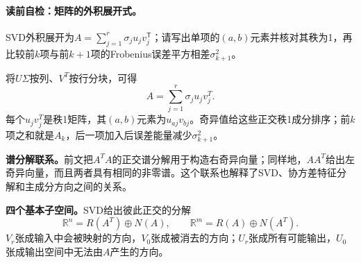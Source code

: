 \paragraph{读前自检：矩阵的外积展开式。}SVD外积展开为$A=\sum_{j=1}^r\sigma_ju_jv_j^{\mathsf T}$；请写出单项的$(a,b)$元素并核对其秩为1，再比较前$k$项与前$k+1$项的Frobenius误差平方相差$\sigma_{k+1}^2$。\par

将$U\Sigma$按列、$V^T$按行分块，可得
\[
A=\sum_{j=1}^{r}\sigma_ju_jv_j^T.
\]
每个$u_jv_j^T$是秩1矩阵，其$(a,b)$元素为$u_{aj}v_{bj}$。奇异值给这些正交秩1成分排序；前$k$项之和就是$A_k$，后一项加入后误差能量减少$\sigma_{k+1}^2$。

\textbf{谱分解联系。}前文把$A^TA$的正交谱分解用于构造右奇异向量；同样地，$AA^T$给出左奇异向量，而且两者具有相同的非零谱。这个联系也解释了SVD、协方差特征分解和主成分方向之间的关系。

\textbf{四个基本子空间。}SVD给出彼此正交的分解
\[
\mathbb R^n=R(A^T)\oplus N(A),\qquad
\mathbb R^m=R(A)\oplus N(A^T).
\]
$V_r$张成输入中会被映射的方向，$V_0$张成被消去的方向；$U_r$张成所有可能输出，$U_0$张成输出空间中无法由$A$产生的方向。


